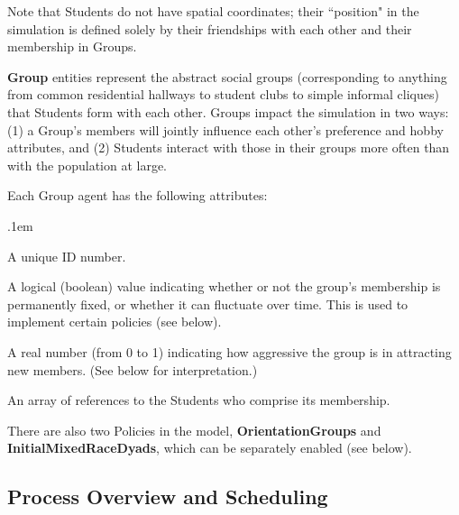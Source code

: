 Note that Students do not have spatial coordinates; their ``position" in the
simulation is defined solely by their friendships with each other and their
membership in Groups.

\vspace{.2in}

\textbf{Group} entities represent the abstract social groups (corresponding to
anything from common residential hallways to student clubs to simple informal
cliques) that Students form with each other. Groups impact the simulation in
two ways: (1) a Group's members will jointly influence each other's preference
and hobby attributes, and (2) Students interact with those in their groups
more often than with the population at large.

\vspace{.1in}
Each Group agent has the following attributes:

\begin{description}
\itemsep.1em

\item[ID] A unique ID number.

\item[IsFixed] A logical (boolean) value indicating whether or not the
group's membership is permanently fixed, or whether it can
fluctuate over time. This is used to implement certain policies (see below).

\item[RecruitmentFactor] A real number (from 0 to 1) indicating how
aggressive the group is in attracting new members. (See below for
interpretation.)

\item[Members] An array of references to the Students who comprise its
membership.

\end{description}

There are also two Policies in the model, \textbf{OrientationGroups} and
\textbf{InitialMixedRaceDyads}, which can be separately enabled (see below).




\subsection{Process Overview and Scheduling}

